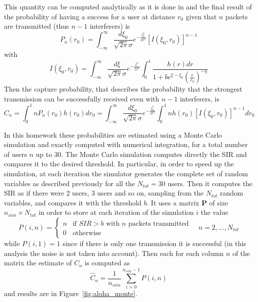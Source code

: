 \documentclass[10pt]{article}
\begin{document}
This quantity can be computed analytically as it is done in \cite{capture} and the final result of the probability of having a success for a user at distance $r_0$ given that $n$ packets are transmitted (thus $n-1$ interferers) is
\begin{equation}
  P_n(r_0) = \int_{-\infty}^{\infty} \frac{d\xi_0}{\sqrt{2\pi}\sigma} e^{-\frac{\xi_0^2}{2\sigma^2}}[I(\xi_0, r_0)]^{n-1}
\end{equation}
with 
\begin{equation}
  I(\xi_0, r_0) = \int_{-\infty}^{\infty} \frac{d\xi}{\sqrt{2\pi}\sigma}e^{-\frac{\xi^2}{2\sigma^2}} \int_{0}^{1} \frac{h(r) dr}{1+be^{\xi - \xi_0}\left(\frac{r}{r_0}\right)^{-\eta}}
  \label{eq:I}
\end{equation}
Then the capture probability, that describes the probability that the strongest transmission can be successfully received even with $n-1$ interferers, is
\begin{equation}
  C_n = \int_0^1 nP_n(r_0)h(r_0) dr_0 = \int_{-\infty}^{\infty} \frac{d\xi_0}{\sqrt{2\pi}\sigma} e^{-\frac{\xi_0^2}{2\sigma^2}} \int_0^1 n h(r_0) [I(\xi_0, r_0)]^{n-1} dr_0
  \label{eq:cn}
\end{equation}

In this homework these probabilities are estimated using a Monte Carlo simulation and exactly computed with numerical integration, for a total number of users $n$ up to 30. The Monte Carlo simulation computes directly the SIR and compares it to the desired threshold. In particular, in order to speed up the simulation, at each iteration the simulator generates the complete set of random variables as described previously for all the $N_{tot} = 30$ users. Then it computes the SIR as if there were 2 users, 3 users and so on, sampling from the $N_{tot}$ random variables, and compares it with the threshold $b$. It uses a matrix $\mathbf{P}$ of size $n_{sim} \times N_{tot}$ in order to store at each iteration of the simulation $i$ the value
\begin{equation}
P(i, n) = 
\begin{cases}
  n & \mbox{if } SIR > b \mbox{ with } n \mbox{ packets transmitted}\\
  0 & \mbox{otherwise}
\end{cases}
 \quad n = 2, \dots, N_{tot}
\end{equation}
while $P(i, 1) = 1$ since if there is only one transmission it is successful (in this analysis the noise is not taken into account).
Then each for each column $n$ of the matrix the estimate of $C_n$ is computed as
\begin{equation}
  \hat{C}_n = \frac{1}{n_{sim}} \sum_{i = 0}^{n_{sim} - 1} P(i, n)
\end{equation}
and results are in Figure~\ref{fig:aloha_monte}.
\end{document}
